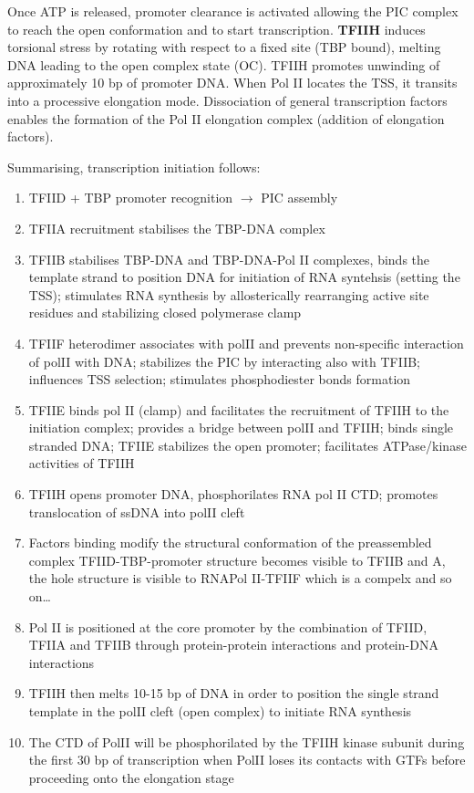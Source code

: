 Once ATP is released, promoter clearance is activated allowing the PIC complex to reach the open conformation and to start transcription. \textbf{TFIIH} induces torsional stress by rotating with respect to a fixed site (TBP bound), melting DNA leading to the open complex state (OC). TFIIH promotes unwinding of approximately 10 bp of promoter DNA. When Pol II locates the TSS, it transits into a processive elongation mode. Dissociation of general transcription factors enables the formation of the Pol II elongation complex (addition of elongation factors).

Summarising, transcription initiation follows:

\begin{enumerate}
\def\labelenumi{\arabic{enumi}.}
\tightlist
\item
  TFIID + TBP promoter recognition $\rightarrow$ PIC assembly
\item
  TFIIA recruitment stabilises the TBP-DNA complex
\item
  TFIIB stabilises TBP-DNA and TBP-DNA-Pol II complexes, binds the template strand to position DNA for initiation of RNA syntehsis (setting the TSS); stimulates RNA synthesis by allosterically rearranging active site residues and stabilizing closed polymerase clamp
\item
  TFIIF heterodimer associates with polII and prevents non-specific interaction of polII with DNA; stabilizes the PIC by interacting also with TFIIB; influences TSS selection; stimulates phosphodiester bonds formation
\item
  TFIIE binds pol II (clamp) and facilitates the recruitment of TFIIH to the initiation complex; provides a bridge between polII and TFIIH; binds single stranded DNA; TFIIE stabilizes the open promoter; facilitates ATPase/kinase activities of TFIIH
\item
  TFIIH opens promoter DNA, phosphorilates RNA pol II CTD; promotes translocation of ssDNA into polII cleft
\item
  Factors binding modify the structural conformation of the preassembled complex TFIID-TBP-promoter structure becomes visible to TFIIB and A, the hole structure is visible to RNAPol II-TFIIF which is a compelx and so on\ldots{}
\item
  Pol II is positioned at the core promoter by the combination of TFIID, TFIIA and TFIIB through protein-protein interactions and protein-DNA interactions
\item
  TFIIH then melts 10-15 bp of DNA in order to position the single strand template in the polII cleft (open complex) to initiate RNA synthesis
\item
  The CTD of PolII will be phosphorilated by the TFIIH kinase subunit during the first 30 bp of transcription when PolII loses its contacts with GTFs before proceeding onto the elongation stage
\end{enumerate}

